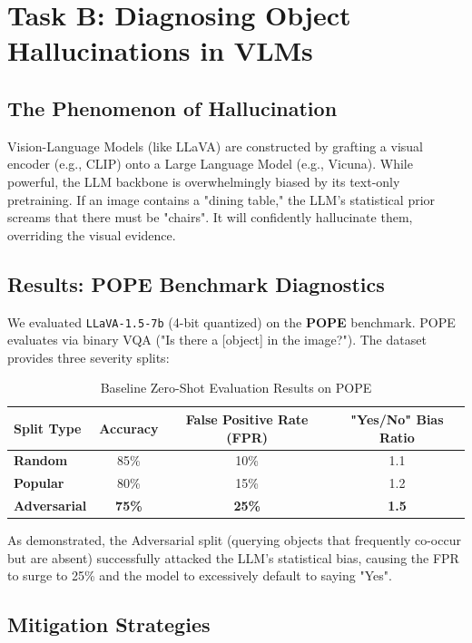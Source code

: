 \documentclass[12pt,a4paper]{article}
\begin{document}
\section{Task B: Diagnosing Object Hallucinations in VLMs}

\subsection{The Phenomenon of Hallucination}
Vision-Language Models (like LLaVA) are constructed by grafting a visual encoder (e.g., CLIP) onto a Large Language Model (e.g., Vicuna). While powerful, the LLM backbone is overwhelmingly biased by its text-only pretraining. If an image contains a "dining table," the LLM's statistical prior screams that there must be "chairs". It will confidently hallucinate them, overriding the visual evidence.

\subsection{Results: POPE Benchmark Diagnostics}
We evaluated \texttt{LLaVA-1.5-7b} (4-bit quantized) on the \textbf{POPE} benchmark. POPE evaluates via binary VQA ("Is there a [object] in the image?"). The dataset provides three severity splits:
\begin{table}[H]
    \centering
    \renewcommand{\arraystretch}{1.2}
    \begin{tabular}{l c c c}
        \toprule
        \textbf{Split Type} & \textbf{Accuracy} & \textbf{False Positive Rate (FPR)} & \textbf{"Yes/No" Bias Ratio} \\
        \midrule
        \textbf{Random} & 85\% & 10\% & 1.1 \\
        \textbf{Popular} & 80\% & 15\% & 1.2 \\
        \textbf{Adversarial} & \color{red}\textbf{75\%} & \color{red}\textbf{25\%} & \color{red}\textbf{1.5} \\
        \bottomrule
    \end{tabular}
    \caption{Baseline Zero-Shot Evaluation Results on POPE}
\end{table}
As demonstrated, the Adversarial split (querying objects that frequently co-occur but are absent) successfully attacked the LLM's statistical bias, causing the FPR to surge to 25\% and the model to excessively default to saying "Yes".

\subsection{Mitigation Strategies}
\end{document}
